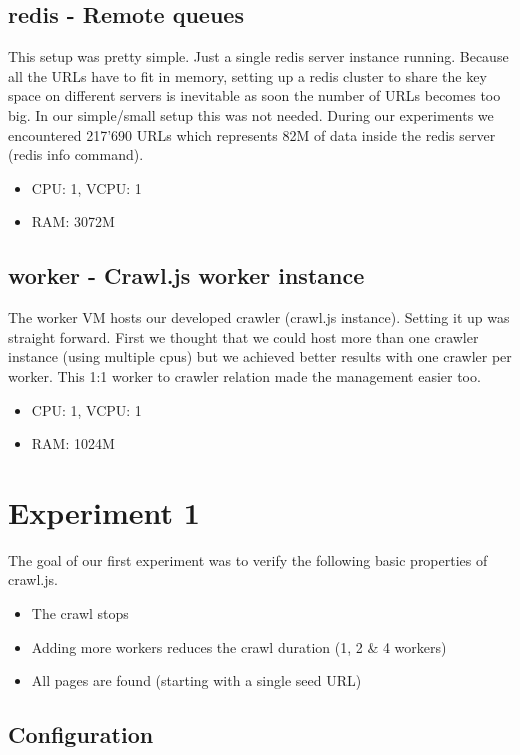\subsection{redis - Remote queues}
This setup was pretty simple. Just a single redis server instance running. Because all the URLs have to fit in memory, setting up a redis cluster to share the key space on different servers is inevitable as soon the number of URLs becomes too big. In our simple/small setup this was not needed. During our experiments we encountered 217'690 URLs which represents 82M of data inside the redis server (redis info command).

\begin{itemize}
  \item CPU: 1, VCPU: 1
  \item RAM: 3072M
\end{itemize}

\subsection{worker - Crawl.js worker instance}
The worker VM hosts our developed crawler (crawl.js instance). Setting it up was straight forward. First we thought that we could host more than one crawler instance (using multiple cpus) but we achieved better results with one crawler per worker. This 1:1 worker to crawler relation made the management easier too.

\begin{itemize}
  \item CPU: 1, VCPU: 1
  \item RAM: 1024M
\end{itemize}

\section{Experiment 1}

The goal of our first experiment was to verify the following basic properties of crawl.js.

\begin{itemize}
  \item The crawl stops
  \item Adding more workers reduces the crawl duration (1, 2 \& 4 workers)
  \item All pages are found (starting with a single seed URL)
\end{itemize}

\subsection{Configuration}

